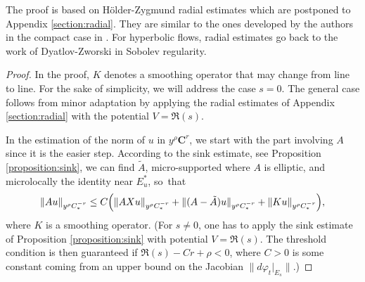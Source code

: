 \documentclass[JEP,XML,SOM,Unicode,NoFloatCountersInSection]{cedram}
\newcommand{\bC}{\boldsymbol{C}}
\theoremstyle{plain}
\theoremstyle{definition}
\begin{document}
The proof is based on Hölder-Zygmund radial estimates which are postponed to Appendix \ref{section:radial}. They are similar to the ones developed by the authors in the compact case in \cite{Bonthonneau-Lefeuvre-21}. For hyperbolic flows, radial estimates go back to the work of Dyatlov-Zworski \cite{Dyatlov-Zworski-16} in Sobolev regularity.

\begin{proof}
In the proof, $K$ denotes a smoothing operator that may change from line to line. For the sake of simplicity, we will address the case $s=0$. The general case follows from minor adaptation by applying the radial estimates of Appendix \ref{section:radial} with the potential $V=\Re(s)$.

In the estimation of the norm of $u$ in $y^\rho \bC^r$, we start with the part involving $A$ since it is the easier step. According to the sink estimate, see Proposition \ref{proposition:sink}, we can find $\tilde{A}$, micro-supported where $A$ is elliptic, and microlocally the identity near $E^\ast_u$, so~that
\[
\| A u \|_{y^\rho C^{-r}_*} \leq C \Bigl(\| A Xu \|_{y^\rho C^{-r}_*} + \|(A-\tilde{A})u\|_{y^\rho C^{-r}_*} + \| K u \|_{y^\rho C^{-r}_*}\Bigr),
\]
where $K$ is a smoothing operator. (For $s \neq 0$, one has to apply the sink estimate of Proposition \ref{proposition:sink} with potential $V = \Re(s)$. The threshold condition is then guaranteed if $\Re(s) - Cr + \rho < 0$, where $C > 0$ is some constant coming from an upper bound on the Jacobian $\|d\varphi_{t}|_{E_s}\|$.)


\end{proof}
\end{document}
